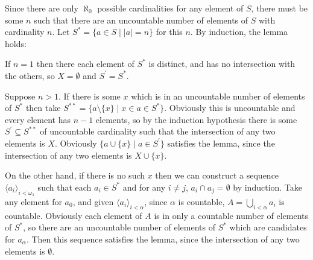 \documentclass[12pt]{article}
\begin{document}
Since there are only $\aleph_0$ possible cardinalities for any element of $S$, there must be some $n$ such that there are an uncountable number of elements of $S$ with cardinality $n$.  Let $S^*=\{a\in S\mid |a|=n\}$ for this $n$.  By induction, the lemma holds:

If $n=1$ then there each element of $S^*$ is distinct, and has no intersection with the others, so $X=\emptyset$ and $S^\prime=S^*$.

Suppose $n>1$.  If there is some $x$ which is in an uncountable number of elements of $S^*$ then take $S^{**}=\{a\setminus\{x\}\mid x\in a\in S^*\}$.  Obviously this is uncountable and every element has $n-1$ elements, so by the induction hypothesis there is some $S^\prime\subseteq S^{**}$ of uncountable cardinality such that the intersection of any two elements is $X$.  Obviously $\{a\cup\{x\}\mid a\in S^\prime\}$ satisfies the lemma, since the intersection of any two elements is $X\cup\{x\}$.

On the other hand, if there is no such $x$ then we can construct a sequence $\langle a_i\rangle_{i<\omega_1}$ such that each $a_i\in S^*$ and for any $i\neq j$, $a_i\cap a_j=\emptyset$ by induction.  Take any element for $a_0$, and given $\langle a_i\rangle_{i<\alpha}$, since $\alpha$ is countable, $A=\bigcup_{i<\alpha} a_i$ is countable.  Obviously each element of $A$ is in only a countable number of elements of $S^*$, so there are an uncountable number of elements of $S^*$ which are candidates for $a_\alpha$.  Then this sequence satisfies the lemma, since the intersection of any two elements is $\emptyset$.
\end{document}
